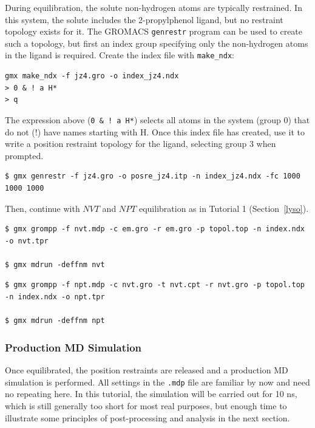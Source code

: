 \documentclass[9pt,tutorial,pubversion]{livecoms}
\begin{document}
During equilibration, the solute non-hydrogen atoms are typically restrained. In this system, the solute includes the 2-propylphenol ligand, but no restraint topology exists for it. The GROMACS \texttt{genrestr} program can be used to create such a topology, but first an index group specifying only the non-hydrogen atoms in the ligand is required. Create the index file with \texttt{make\_ndx}:

\begin{lstlisting}
gmx make_ndx -f jz4.gro -o index_jz4.ndx
> 0 & ! a H*
> q
\end{lstlisting}
%
The expression above (\texttt{0 \& ! a H*}) selects all atoms in the system (group 0) that do not (!) have names starting with H. Once this index file has created, use it to write a position restraint topology for the ligand, selecting group 3 when prompted.

\begin{lstlisting}
$ gmx genrestr -f jz4.gro -o posre_jz4.itp -n index_jz4.ndx -fc 1000 1000 1000
\end{lstlisting}

Then, continue with $NVT$ and $NPT$ equilibration as in Tutorial 1 (Section~\ref{lyso}).

\begin{lstlisting}
$ gmx grompp -f nvt.mdp -c em.gro -r em.gro -p topol.top -n index.ndx -o nvt.tpr

$ gmx mdrun -deffnm nvt
\end{lstlisting}

\begin{lstlisting}
$ gmx grompp -f npt.mdp -c nvt.gro -t nvt.cpt -r nvt.gro -p topol.top -n index.ndx -o npt.tpr

$ gmx mdrun -deffnm npt
\end{lstlisting}

\subsubsection{Production MD Simulation} \label{complex_md}

Once equilibrated, the position restraints are released and a production MD simulation is performed. All settings in the \texttt{.mdp} file are familiar by now and need no repeating here. In this tutorial, the simulation will be carried out for 10 ns, which is still generally too short for most real purposes, but enough time to illustrate some principles of post-processing and analysis in the next section.
\end{document}
